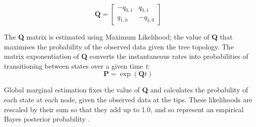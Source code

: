 \documentclass[titlepage]{article}
\begin{document}
\[
\textbf{Q} = \begin{bmatrix}
    -q_{0,1} & q_{0,1} \\
    q_{1,0} & -q_{1,0}
\end{bmatrix}
\]


The \textbf{Q} matrix is estimated using Maximum Likelihood; the value of \textbf{Q} that maximises the probability of the observed data given the tree topology. 
The matrix exponentiation of \textbf{Q} converts the instantaneous rates into probabilities of transitioning between states over a given time \textit{t}:
\[\textbf{P} = \exp(\textbf{Q}\textit{t})\]

Global marginal estimation fixes the value of \textbf{Q} and calculates the probability of each state at each node, given the observed data at the tips.
These likelihoods are rescaled by their sum so that they add up to 1.0, and so represent an empirical Bayes posterior probability \citep{revell2025ancestral}. 



\end{document}
